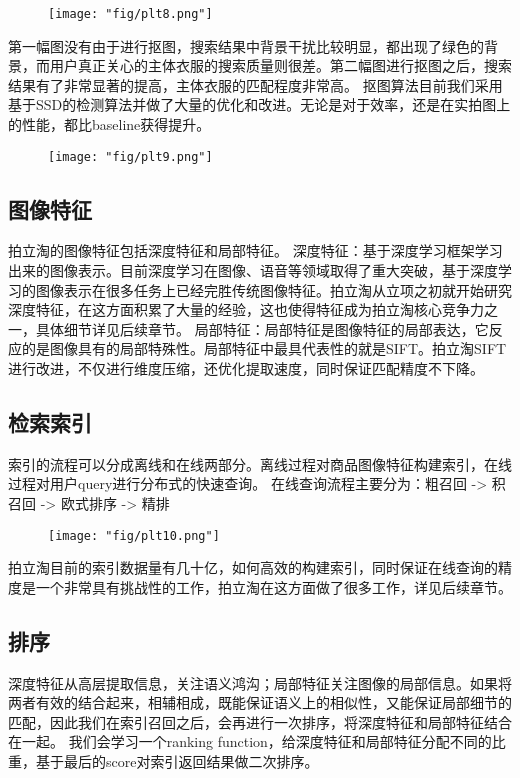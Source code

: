 \begin{figure}[!h]
	\centering
	\texttt{[image: "fig/plt8.png"]}
	\caption{}
	\label{fig:plt8}
\end{figure}

第一幅图没有由于进行抠图，搜索结果中背景干扰比较明显，都出现了绿色的背景，而用户真正关心的主体衣服的搜索质量则很差。第二幅图进行抠图之后，搜索结果有了非常显著的提高，主体衣服的匹配程度非常高。
抠图算法目前我们采用基于SSD的检测算法并做了大量的优化和改进。无论是对于效率，还是在实拍图上的性能，都比baseline获得提升。

\begin{figure}[!h]
	\centering
	\texttt{[image: "fig/plt9.png"]}
	\caption{}
	\label{fig:plt9}
\end{figure}

\subsection{图像特征}
拍立淘的图像特征包括深度特征和局部特征。
深度特征：基于深度学习框架学习出来的图像表示。目前深度学习在图像、语音等领域取得了重大突破，基于深度学习的图像表示在很多任务上已经完胜传统图像特征。拍立淘从立项之初就开始研究深度特征，在这方面积累了大量的经验，这也使得特征成为拍立淘核心竞争力之一，具体细节详见后续章节。
局部特征：局部特征是图像特征的局部表达，它反应的是图像具有的局部特殊性。局部特征中最具代表性的就是SIFT。拍立淘SIFT进行改进，不仅进行维度压缩，还优化提取速度，同时保证匹配精度不下降。

\subsection{检索索引}
索引的流程可以分成离线和在线两部分。离线过程对商品图像特征构建索引，在线过程对用户query进行分布式的快速查询。
在线查询流程主要分为：粗召回 -> 积召回 -> 欧式排序 -> 精排

\begin{figure}[!h]
	\centering
	\texttt{[image: "fig/plt10.png"]}
	\caption{}
	\label{fig:plt10}
\end{figure}

拍立淘目前的索引数据量有几十亿，如何高效的构建索引，同时保证在线查询的精度是一个非常具有挑战性的工作，拍立淘在这方面做了很多工作，详见后续章节。

\subsection{排序}
深度特征从高层提取信息，关注语义鸿沟；局部特征关注图像的局部信息。如果将两者有效的结合起来，相辅相成，既能保证语义上的相似性，又能保证局部细节的匹配，因此我们在索引召回之后，会再进行一次排序，将深度特征和局部特征结合在一起。
我们会学习一个ranking function，给深度特征和局部特征分配不同的比重，基于最后的score对索引返回结果做二次排序。

